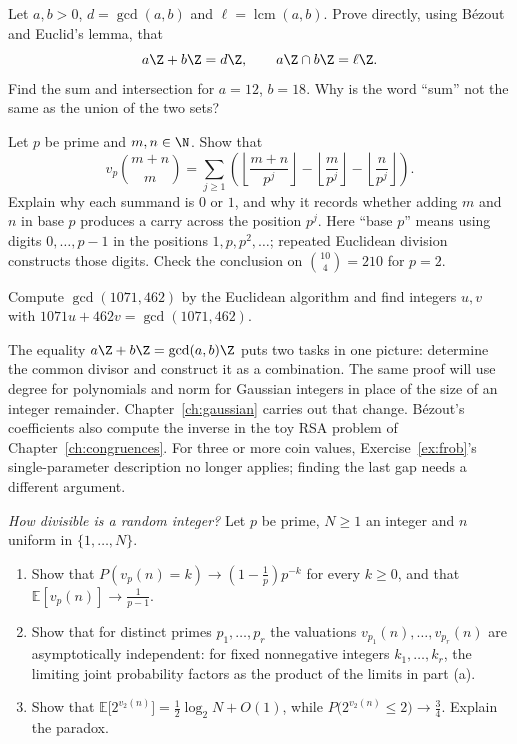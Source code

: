 \begin{exercise}[$\star\star$]\label{ex:t1-divisibility-lattice}
Let $a,b>0$, $d=\gcd(a,b)$ and $\ell=\operatorname{lcm}(a,b)$. Prove directly, using B\'ezout and Euclid's lemma, that
\[
a\Z+b\Z=d\Z,\qquad a\Z\cap b\Z=\ell\Z.
\]
Find the sum and intersection for $a=12$, $b=18$. Why is the word ``sum'' not the same as the union of the two sets?
\end{exercise}

\begin{exercise}[$\star\star$]\label{ex:t1-binomial-carry}
Let $p$ be prime and $m,n\in\N$. Show that
\[
v_p\binom{m+n}m=
\sum_{j\ge1}\left(\left\lfloor\frac{m+n}{p^j}\right\rfloor-
\left\lfloor\frac m{p^j}\right\rfloor-
\left\lfloor\frac n{p^j}\right\rfloor\right).
\]
Explain why each summand is $0$ or $1$, and why it records whether adding $m$ and $n$ in base $p$ produces a carry across the position $p^j$. Here ``base $p$'' means using digits $0,\ldots,p-1$ in the positions $1,p,p^2,\ldots$; repeated Euclidean division constructs those digits. Check the conclusion on $\binom{10}4=210$ for $p=2$.
\end{exercise}

\begin{exercise}[$\star$]\label{ex:t1-euclid1071}
Compute $\gcd(1071,462)$ by the Euclidean algorithm and find integers $u,v$ with $1071u+462v=\gcd(1071,462)$.
\end{exercise}

\begin{beauty}
The equality $a\Z+b\Z=\gcd(a,b)\Z$ puts two tasks in one picture: determine the common divisor and construct it as a combination. The same proof will use degree for polynomials and norm for Gaussian integers in place of the size of an integer remainder. Chapter~\ref{ch:gaussian} carries out that change. B\'ezout's coefficients also compute the inverse in the toy RSA problem of Chapter~\ref{ch:congruences}. For three or more coin values, Exercise~\ref{ex:frob}'s single-parameter description no longer applies; finding the last gap needs a different argument.
\end{beauty}

\begin{exercise}[$\star\star$]\label{pb:valuation}
\emph{How divisible is a random integer?} Let $p$ be prime, $N\ge1$ an integer and $n$ uniform in $\{1,\dots,N\}$.
\begin{enumerate}[label=(\alph*)]
\item Show that $P(v_p(n)=k)\to(1-\frac1p)p^{-k}$ for every $k\ge0$, and that $\mathbb E[v_p(n)]\to\frac1{p-1}$.
\item Show that for distinct primes $p_1,\dots,p_r$ the valuations $v_{p_1}(n),\dots,v_{p_r}(n)$ are asymptotically independent: for fixed nonnegative integers $k_1,\dots,k_r$, the limiting joint probability factors as the product of the limits in part (a).
\item Show that $\mathbb E\bigl[2^{v_2(n)}\bigr]=\frac12\log_2N+O(1)$, while $P\bigl(2^{v_2(n)}\le2\bigr)\to\frac34$. Explain the
paradox.
\end{enumerate}
\end{exercise}

